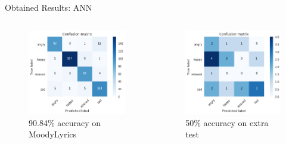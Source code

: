 \documentclass[xcolor=dvipsnames]{beamer}
\begin{document}
\begin{frame}{Obtained Results: ANN}
\begin{columns}
\begin{figure}
	\includegraphics[scale=0.5,left]{./images/ann-ml-cm}
	\caption{90.84\% accuracy on MoodyLyrics}
\end{figure}

\begin{figure}
	\includegraphics[scale=0.5,left]{./images/ann-extra-cm}
	\caption{50\% accuracy on extra test}
\end{figure}

\end{columns}
\end{frame}
\end{document}
